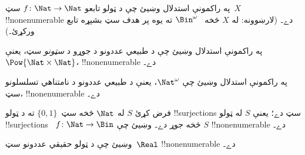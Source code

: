 \documentclass[../../../include/open-logic-section]{subfiles}
\begin{document}
\begin{prob}\label{sfr:siz:red:prob:nat-nat}
  په راکمونې استدلال وښيئ چې د ټولو تابعو $f\colon \Nat \to \Nat$
  سټ~$X$ !!{nonenumerable} دے۔ (لارښوونه: له $X$ څخه
  ~$\Bin^\omega$ ته يوه پر هدف سټ بشپړه تابع ورکړئ۔)
\end{prob}

\begin{prob}
په راکمونې استدلال وښيئ چې د طبيعي عددونو د جوړو د
\emph{سټونو} سټ، يعنې $\Pow{\Nat \times \Nat}$،
!!{nonenumerable} دے۔
\end{prob}

\begin{prob}
په راکمونې استدلال وښيئ چې $\Nat^\omega$، يعنې د طبيعي عددونو
د نامتناهي تسلسلونو سټ، !!{nonenumerable} دے۔
\end{prob}


\begin{prob}
فرض کړئ $S$ له $\Nat$ څخه سټ~$\{0,1\}$ ته د ټولو
!!{surjection}s سټ دے؛ يعنې $S$ له ټولو !!{surjection}s
~$f \colon \Nat \to \Bin$ څخه جوړ دے۔ وښيئ چې $S$
!!{nonenumerable} دے۔
\end{prob}

\begin{prob}
وښيئ چې د ټولو حقيقي عددونو سټ~$\Real$ !!{nonenumerable} دے۔
\end{prob}
\end{document}
